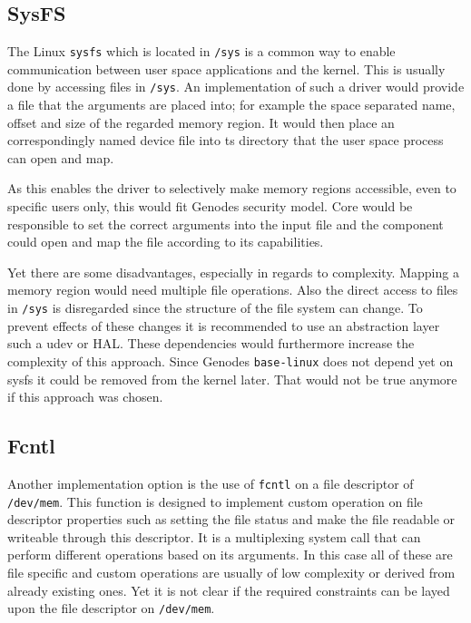 \documentclass[
a4paper,
12pt,
notitlepage,
parskip=half,
DIV=11,
]{scrbook}
\begin{document}
		\subsection{SysFS}
		
		The Linux \texttt{sysfs} which is located in \texttt{/sys} is a common way to enable communication between user space applications and the kernel.
		This is usually done by accessing files in \texttt{/sys}.
		An implementation of such a driver would provide a file that the arguments are placed into; for example the space separated name, offset and size of the regarded memory region.
		It would then place an correspondingly named device file into ts directory that the user space process can open and map. \citep{sysfs}
		
		As this enables the driver to selectively make memory regions accessible, even to specific users only, this would fit Genodes security model.
		Core would be responsible to set the correct arguments into the input file and the component could open and map the file according to its capabilities.
		
		Yet there are some disadvantages, especially in regards to complexity.
		Mapping a memory region would need multiple file operations.
		Also the direct access to files in \texttt{/sys} is disregarded since the structure of the file system can change.
		To prevent effects of these changes it is recommended to use an abstraction layer such a udev or HAL.
		These dependencies would furthermore increase the complexity of this approach.
		Since Genodes \texttt{base-linux} does not depend yet on sysfs it could be removed from the kernel later.
		That would not be true anymore if this approach was chosen. \citep{sysfs}
		
		\subsection{Fcntl}
		
		Another implementation option is the use of \texttt{fcntl} on a file descriptor of \texttt{/dev/mem}.
		This function is designed to implement custom operation on file descriptor properties such as setting the file status and make the file readable or writeable through this descriptor.
		It is a multiplexing system call that can perform different operations based on its arguments.
		In this case all of these are file specific and custom operations are usually of low complexity or derived from already existing ones.
		Yet it is not clear if the required constraints can be layed upon the file descriptor on \texttt{/dev/mem}. \citep{syscall} \citep{fcntl}
		
\end{document}
